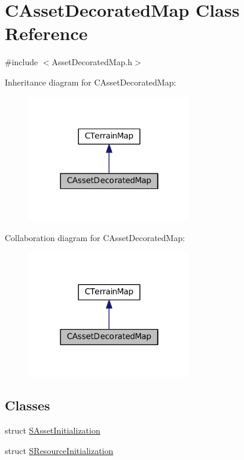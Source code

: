 \hypertarget{classCAssetDecoratedMap}{}\section{C\+Asset\+Decorated\+Map Class Reference}
\label{classCAssetDecoratedMap}


{\ttfamily \#include $<$Asset\+Decorated\+Map.\+h$>$}



Inheritance diagram for C\+Asset\+Decorated\+Map\+:\nopagebreak
\begin{figure}[H]
\begin{center}
\leavevmode
\includegraphics[width=202pt]{classCAssetDecoratedMap__inherit__graph}
\end{center}
\end{figure}


Collaboration diagram for C\+Asset\+Decorated\+Map\+:\nopagebreak
\begin{figure}[H]
\begin{center}
\leavevmode
\includegraphics[width=202pt]{classCAssetDecoratedMap__coll__graph}
\end{center}
\end{figure}
\subsection*{Classes}
\begin{DoxyCompactItemize}
\item 
struct \hyperlink{structCAssetDecoratedMap_1_1SAssetInitialization}{S\+Asset\+Initialization}
\item 
struct \hyperlink{structCAssetDecoratedMap_1_1SResourceInitialization}{S\+Resource\+Initialization}
\end{DoxyCompactItemize}
